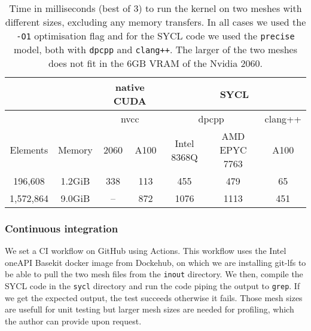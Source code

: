 \documentclass[../main]{subfiles}
\begin{document}
\begin{center}
	\begin{table}
		\begin{tabular}{||c c | c c c c c||}
			\hline
			    &   & \multicolumn{2}{|c|}{native CUDA} & \multicolumn{3}{c||}{SYCL}                   \\ [0.5ex]
		    \hline
			    &   & \multicolumn{2}{|c|}{nvcc}        & \multicolumn{2}{c|}{dpcpp} & clang++         \\ [0.5ex]
			\hline
			Elements   & Memory  & 2060  & A100  & Intel 8368Q  & AMD EPYC 7763  & A100                \\ [0.5ex]
			\hline\hline
			196,608    & 1.2GiB  & 338   & 113   & 455          & 479            & 65                  \\ [0.5ex]
			1,572,864  & 9.0GiB  & --    & 872   & 1076         & 1113           & 451                 \\ [0.5ex]
			\hline
		\end{tabular}
		\caption{\label{tab:benchmarks}Time in milliseconds (best of 3) to run the kernel on two meshes with different sizes, excluding any memory transfers. In all cases we used the \texttt{-O1} optimisation flag and for the SYCL code we used the \texttt{precise} model, both with \texttt{dpcpp} and \texttt{clang++}. The larger of the two meshes does not fit in the 6GB VRAM of the Nvidia 2060.}
	\end{table}
\end{center}


\subsubsection{Continuous integration}\label{sec:dgpoly3d_ci}
We set a CI workflow on GitHub using Actions.
This workflow uses the Intel oneAPI Basekit docker image from Dockehub, on which we are installing git-lfs to be able to pull the two mesh files from the \texttt{inout} directory.
We then, compile the SYCL code in the \texttt{sycl} directory and run the code piping the output to \texttt{grep}.
If we get the expected output, the test succeeds otherwise it fails.
Those mesh sizes are usefull for unit testing but larger mesh sizes are needed for profiling, which the author can provide upon request.
\end{document}
